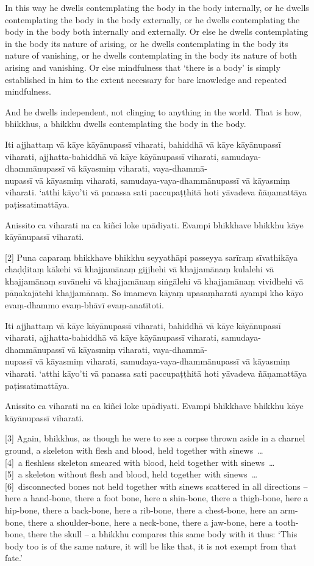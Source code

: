In this way he dwells contemplating the body in the body internally, or he
dwells contemplating the body in the body externally, or he dwells contemplating
the body in the body both internally and externally. Or else he dwells
contemplating in the body its nature of arising, or he dwells contemplating in
the body its nature of vanishing, or he dwells contemplating in the body its
nature of both arising and vanishing. Or else mindfulness that ‘there is a body’
is simply established in him to the extent necessary for bare knowledge and
repeated mindfulness.

And he dwells independent, not clinging to anything in the world. That is how,
bhikkhus, a bhikkhu dwells contemplating the body in the body.

\paliPage

Iti ajjhattaṃ vā kāye kāyānupassī viharati, bahiddhā vā kāye kāyānupassī
viharati, ajjhatta-bahiddhā vā kāye kāyānupassī viharati, samudaya-dhammānupassī
vā kāyasmiṃ viharati, vaya-dhammā-\\
nupassī vā kāyasmiṃ viharati, samudaya-vaya-dhammānupassī vā kāyasmiṃ viharati.
`atthi kāyo'ti vā panassa sati paccupaṭṭhitā hoti yāvadeva ñāṇamattāya
paṭissatimattāya.

Anissito ca viharati na ca kiñci loke upādiyati. Evampi bhikkhave bhikkhu kāye
kāyānupassī viharati.

[2] Puna caparaṃ bhikkhave bhikkhu seyyathāpi passeyya sarīraṃ sīvathikāya chaḍḍitaṃ
kākehi vā khajjamānaṃ gijjhehi vā khajjamānaṃ kulalehi vā khajjamānaṃ suvānehi
vā khajjamānaṃ siṅgālehi vā khajjamānaṃ vividhehi vā pāṇakajātehi khajjamānaṃ.
So imameva kāyaṃ upasaṃharati ayampi kho kāyo evaṃ-dhammo evaṃ-bhāvī
evaṃ-anatītoti.

Iti ajjhattaṃ vā kāye kāyānupassī viharati, bahiddhā vā kāye kāyānupassī
viharati, ajjhatta-bahiddhā vā kāye kāyānupassī viharati, samudaya-dhammānupassī
vā kāyasmiṃ viharati, vaya-dhammā-\\
nupassī vā kāyasmiṃ viharati, samudaya-vaya-dhammānupassī vā kāyasmiṃ viharati.
`atthi kāyo'ti vā panassa sati paccupaṭṭhitā hoti yāvadeva ñāṇamattāya
paṭissatimattāya.

Anissito ca viharati na ca kiñci loke upādiyati. Evampi bhikkhave bhikkhu kāye
kāyānupassī viharati.

\englishPage

[3] Again, bhikkhus, as though he were to see a corpse thrown aside in a
charnel ground, a skeleton with flesh and blood, held together with sinews~\ldots{}\\
{}[4]~a fleshless skeleton smeared with blood, held together with sinews~\ldots{}\\
{}[5]~a skeleton without flesh and blood, held together with sinews~\ldots{}\\
{}[6]~disconnected bones not held together with sinews scattered in all directions
-- here a hand-bone, there a foot bone, here a shin-bone, there a thigh-bone,
here a hip-bone, there a back-bone, here a rib-bone, there a chest-bone, here an
arm-bone, there a shoulder-bone, here a neck-bone, there a jaw-bone, here a
tooth-bone, there the skull -- a bhikkhu compares this same body with it thus:
`This body too is of the same nature, it will be like that, it is not exempt
from that fate.'

